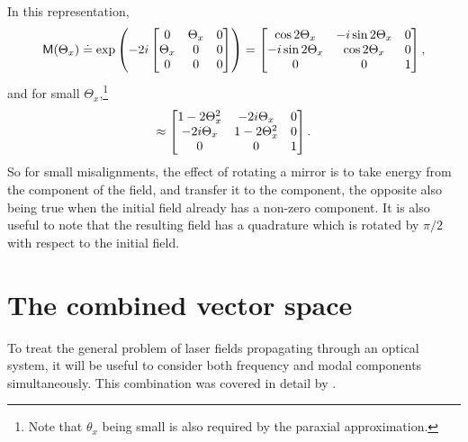 In this representation, 
\begin{equation}
\mathsf{M}(\Theta_x) \doteq \exp \left( -2i 
\left[\begin{matrix} 
0 & \Theta_x & 0 \\
\Theta_x & 0 & 0 \\
0 & 0 & 0 
\end{matrix}\right]
\right)
=
\left[\begin{matrix}
\cos {2\Theta_x} & -i\sin{2\Theta_x}& 0 \\
-i\sin {2\Theta_x} & \cos{2\Theta_x}& 0 \\
0 & 0 & 1 \\
\end{matrix}\right] ,
\end{equation}
and for small $\Theta_x$,\footnote{Note that $\theta_x$ being small is also required by the paraxial approximation.}
\[
\approx
\left[\begin{matrix}
1-2\Theta_x^2 & -2i\Theta_x& 0 \\
-2i\Theta_x & 1-2\Theta_x^2& 0 \\
0 & 0 & 1 \\
\end{matrix}\right] .
\]
So for small misalignments, the effect of rotating a mirror is to take energy from the  component of the field, and transfer it to the  component, the opposite also being true when the initial field already has a non-zero  component. %
It is also useful to note that the resulting  field has a quadrature which is rotated by $\pi/2$ with respect to the initial  field.

\section{The combined vector space}
To treat the general problem of laser fields propagating through an optical system, it will be useful to consider both frequency and modal components simultaneously. %
This combination was covered in detail by \citet{Sigg:00}.

